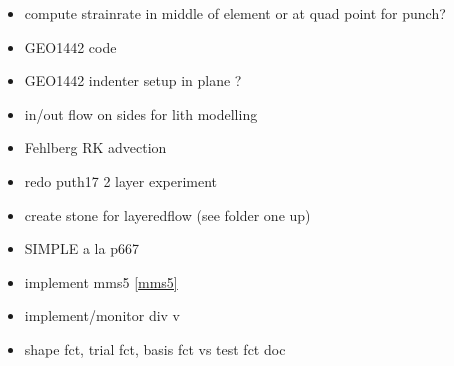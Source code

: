 \begin{itemize}
\item compute strainrate in middle of element or at quad point for punch?
\item GEO1442 code 
\item GEO1442 indenter setup in plane ?
\item in/out flow on sides for lith modelling
\item Fehlberg RK advection
\item redo puth17 2 layer experiment
\item create stone for layeredflow (see folder one up)
\item SIMPLE a la p667 \cite{john16} 
\item implement mms5 \ref{mms5}
\item implement/monitor div v
\item shape fct, trial fct, basis fct vs test fct doc
\end{itemize}

